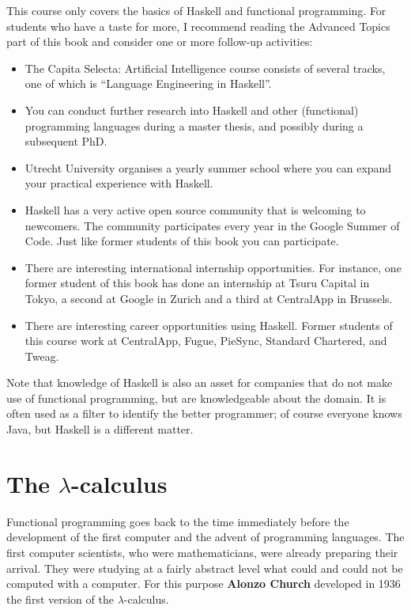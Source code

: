 This course only covers the basics of Haskell and functional programming. For
students who have a taste for more, I recommend reading the Advanced Topics
part of this book and consider one or more follow-up activities:
\begin{itemize}
\item The Capita Selecta: Artificial Intelligence course consists
      of several tracks, one of which is ``Language Engineering in Haskell''.
\item You can conduct further research into Haskell and other (functional)
      programming languages during a master thesis, and possibly during a subsequent PhD.
\item Utrecht University organises a yearly summer school
      where you can expand your practical experience with Haskell.
\item Haskell has a very active open source community
      that is welcoming to newcomers. The community participates every year
      in the Google Summer of Code. Just like former students of this book
      you can participate.
\item There are interesting international internship opportunities. 
      For instance, one former student of this book has done an internship
      at Tsuru Capital in Tokyo, a second 
      at Google in Zurich and a third at CentralApp in Brussels.
\item There are interesting career opportunities using Haskell. 
      Former students of this course work at CentralApp, Fugue, PieSync, Standard Chartered, and Tweag.
\end{itemize}

Note that knowledge of Haskell is also an asset for companies that do not
make use of functional programming, but are knowledgeable about the domain.
It is often used as a filter to identify the better programmer; of course
everyone knows Java, but Haskell is a different matter.

\section{The $\lambda$-calculus}

Functional programming goes back to the time immediately before the development
of the first computer and the advent of programming languages. The first
computer scientists, who were mathematicians, were already preparing their arrival.
They were studying at a fairly abstract level what could and could not be computed
with a computer. For this purpose \textbf{Alonzo Church} developed in 1936 
the first version of the $\lambda$-calculus. 

